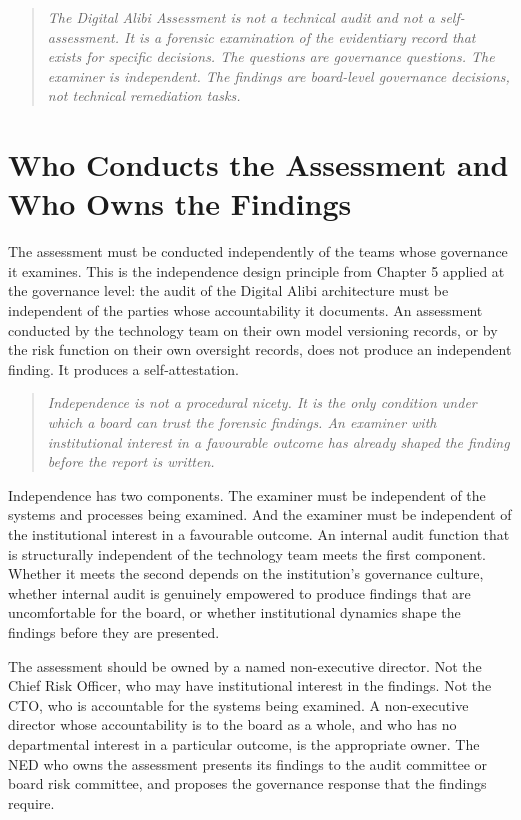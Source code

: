 \begin{quote}
\emph{The Digital Alibi Assessment is not a technical audit and not a self-assessment. It is a forensic examination of the evidentiary record that exists for specific decisions. The questions are governance questions. The examiner is independent. The findings are board-level governance decisions, not technical remediation tasks.}
\end{quote}

\scenebreak

\section{Who Conducts the Assessment and Who Owns the Findings}

The assessment must be conducted independently of the teams whose governance it examines. This is the independence design principle from Chapter 5 applied at the governance level: the audit of the Digital Alibi architecture must be independent of the parties whose accountability it documents. An assessment conducted by the technology team on their own model versioning records, or by the risk function on their own oversight records, does not produce an independent finding. It produces a self-attestation.

\begin{quote}
\emph{Independence is not a procedural nicety. It is the only condition under which a board can trust the forensic findings. An examiner with institutional interest in a favourable outcome has already shaped the finding before the report is written.}
\end{quote}

Independence has two components. The examiner must be independent of the systems and processes being examined. And the examiner must be independent of the institutional interest in a favourable outcome. An internal audit function that is structurally independent of the technology team meets the first component. Whether it meets the second depends on the institution's governance culture, whether internal audit is genuinely empowered to produce findings that are uncomfortable for the board, or whether institutional dynamics shape the findings before they are presented.

The assessment should be owned by a named non-executive director. Not the Chief Risk Officer, who may have institutional interest in the findings. Not the CTO, who is accountable for the systems being examined. A non-executive director whose accountability is to the board as a whole, and who has no departmental interest in a particular outcome, is the appropriate owner. The NED who owns the assessment presents its findings to the audit committee or board risk committee, and proposes the governance response that the findings require.

